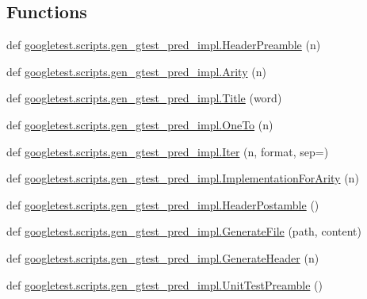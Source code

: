 \subsection*{Functions}
\begin{DoxyCompactItemize}
\item 
def \mbox{\hyperlink{namespacegoogletest_1_1scripts_1_1gen__gtest__pred__impl_ab6b5c7b538445816b4068108287ddb98}{googletest.\+scripts.\+gen\+\_\+gtest\+\_\+pred\+\_\+impl.\+Header\+Preamble}} (n)
\item 
def \mbox{\hyperlink{namespacegoogletest_1_1scripts_1_1gen__gtest__pred__impl_af67125c00cdd1f3860dbca51ac5fe869}{googletest.\+scripts.\+gen\+\_\+gtest\+\_\+pred\+\_\+impl.\+Arity}} (n)
\item 
def \mbox{\hyperlink{namespacegoogletest_1_1scripts_1_1gen__gtest__pred__impl_a86d14c2f4656b60cefe4c3f556a1f325}{googletest.\+scripts.\+gen\+\_\+gtest\+\_\+pred\+\_\+impl.\+Title}} (word)
\item 
def \mbox{\hyperlink{namespacegoogletest_1_1scripts_1_1gen__gtest__pred__impl_aff65c970b0fa35339cbfe53a97499ce4}{googletest.\+scripts.\+gen\+\_\+gtest\+\_\+pred\+\_\+impl.\+One\+To}} (n)
\item 
def \mbox{\hyperlink{namespacegoogletest_1_1scripts_1_1gen__gtest__pred__impl_a5022be9de6397e5835285a0dc7d48a08}{googletest.\+scripts.\+gen\+\_\+gtest\+\_\+pred\+\_\+impl.\+Iter}} (n, format, sep=\textquotesingle{}\textquotesingle{})
\item 
def \mbox{\hyperlink{namespacegoogletest_1_1scripts_1_1gen__gtest__pred__impl_a5a986bb00c959dca3c59f84facf50d97}{googletest.\+scripts.\+gen\+\_\+gtest\+\_\+pred\+\_\+impl.\+Implementation\+For\+Arity}} (n)
\item 
def \mbox{\hyperlink{namespacegoogletest_1_1scripts_1_1gen__gtest__pred__impl_a5ced94dbdb35505facb1eb8f9b38dc43}{googletest.\+scripts.\+gen\+\_\+gtest\+\_\+pred\+\_\+impl.\+Header\+Postamble}} ()
\item 
def \mbox{\hyperlink{namespacegoogletest_1_1scripts_1_1gen__gtest__pred__impl_a2f2af8a9f9cb8901616f70359c464681}{googletest.\+scripts.\+gen\+\_\+gtest\+\_\+pred\+\_\+impl.\+Generate\+File}} (path, content)
\item 
def \mbox{\hyperlink{namespacegoogletest_1_1scripts_1_1gen__gtest__pred__impl_a2705335707586b24cc478f362f81034d}{googletest.\+scripts.\+gen\+\_\+gtest\+\_\+pred\+\_\+impl.\+Generate\+Header}} (n)
\item 
def \mbox{\hyperlink{namespacegoogletest_1_1scripts_1_1gen__gtest__pred__impl_a0bb682dad551f5fc92a64133dd123c7a}{googletest.\+scripts.\+gen\+\_\+gtest\+\_\+pred\+\_\+impl.\+Unit\+Test\+Preamble}} ()

\end{DoxyCompactItemize}
